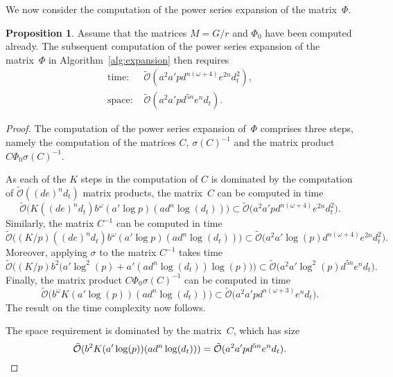 \documentclass[a4paper,11pt]{article}
\numberwithin{equation}{section}
\providecommand{\SoftOh}{\tilde{\mathcal{O}}} %
\theoremstyle{definition}
\newtheorem{prop}[thm]{Proposition}
\begin{document}
We now consider the computation of the power series expansion of the 
matrix~$\Phi$.

\begin{prop}
Assume that the matrices $M = G/r$ and $\Phi_0$ have been computed already.
The subsequent computation of the power series expansion of the matrix~$\Phi$ 
in Algorithm~\ref{alg:expansion} then requires
\begin{align*}
\mbox{time: }  &\SoftOh(a^2 a' p d^{n(\omega+4)}e^{2n} d_t^2), \\
\mbox{space: } &\SoftOh(a^2 a' p d^{5n} e^n d_t).
\end{align*}
\end{prop}

\begin{proof}
The computation of the power series expansion of~$\Phi$ comprises 
three steps, namely the computation of the matrices $C$, $\sigma(C)^{-1}$ 
and the matrix product $C \Phi_0 \sigma(C)^{-1}$.

As each of the $K$ steps in the computation of $C$ is dominated by the 
computation of $\SoftOh((de)^n d_t)$ matrix products, the matrix~$C$ can be 
computed in time 
\begin{equation*}
\SoftOh\bigl(K ((de)^n d_t) b^{\omega} (a' \log p) (a d^n \log(d_t))\bigr) 
    \subset \SoftOh\bigl(a^2 a' p d^{n(\omega + 4)} e^{2n} d_t^2 \bigr).
\end{equation*}
Similarly, the matrix $C^{-1}$ can be computed in time 
\begin{equation*}
\SoftOh\bigl( (K/p) ((de)^n d_t) b^{\omega} (a' \log p) (ad^n \log(d_t)) \bigr)
    \subset \SoftOh\bigl( a^2 a' \log(p) d^{n(\omega+4)} e^{2n} d_t^2 \bigr). 
\end{equation*}
Moreover, applying $\sigma$ to the matrix $C^{-1}$ takes time 
\begin{equation*}
\SoftOh\bigl( (K/p) b^2 \bigl(a' \log^2(p) + a' (a d^n \log(d_t)) \log(p) \bigl) \bigr)
\subset \SoftOh\bigl( a^2 a' \log^2(p) d^{5n} e^n d_t \bigr).
\end{equation*}
Finally, the matrix product 
$C \Phi_0 \sigma(C)^{-1}$ can be computed in time 
\begin{equation*}
\SoftOh\bigl( b^{\omega} K (a' \log(p)) (a d^n \log(d_t)) \bigr) 
    \subset \SoftOh\bigl( a^2 a' p d^{n(\omega + 3)} e^n d_t \bigr).
\end{equation*}
The result on the time complexity now follows.

The space requirement is dominated by the matrix~$C$, which has size
\begin{equation*}
\SoftOh(b^2 K (a' \log(p)) (a d^n \log(d_t))) = \SoftOh(a^2 a' p d^{5n} e^n d_t). \qedhere
\end{equation*}
\end{proof}
\end{document}
